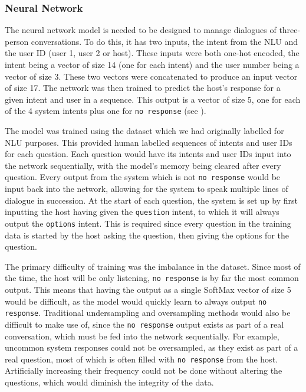 \documentclass[hidelinks, 11pt]{article}
\begin{document}
\subsubsection{Neural Network}
\label{subsec:nn}
The neural network model is needed to be designed to manage dialogues of three-person conversations. To do this, it has two inputs, the intent from the NLU and the user ID (user 1, user 2 or host). These inputs were both one-hot encoded, the intent being a vector of size 14 (one for each intent) and the user number being a vector of size 3. These two vectors were concatenated to produce an input vector of size 17. The network was then trained to predict the host's response for a given intent and user in a sequence. This output is a vector of size 5, one for each of the 4 system intents plus one for \verb|no response| (see ).

The model was trained using the dataset which we had originally labelled for NLU purposes. This provided human labelled sequences of intents and user IDs for each question. Each question would have its intents and user IDs input into the network sequentially, with the model's memory being cleared after every question. Every output from the system which is not \verb|no response| would be input back into the network, allowing for the system to speak multiple lines of dialogue in succession. At the start of each question, the system is set up by first inputting the host having given the \verb|question| intent, to which it will always output the \verb|options| intent. This is required since every question in the training data is started by the host asking the question, then giving the options for the question.

The primary difficulty of training was the imbalance in the dataset. Since most of the time, the host will be only listening, \verb|no response| is by far the most common output. This means that having the output as a single SoftMax vector of size 5 would be difficult, as the model would quickly learn to always output \verb|no response|. Traditional undersampling and oversampling methods would also be difficult to make use of, since the \verb|no response| output exists as part of a real conversation, which must be fed into the network sequentially. For example, uncommon system responses could not be oversampled, as they exist as part of a real question, most of which is often filled with \verb|no response| from the host. Artificially increasing their frequency could not be done without altering the questions, which would diminish the integrity of the data.
\end{document}
